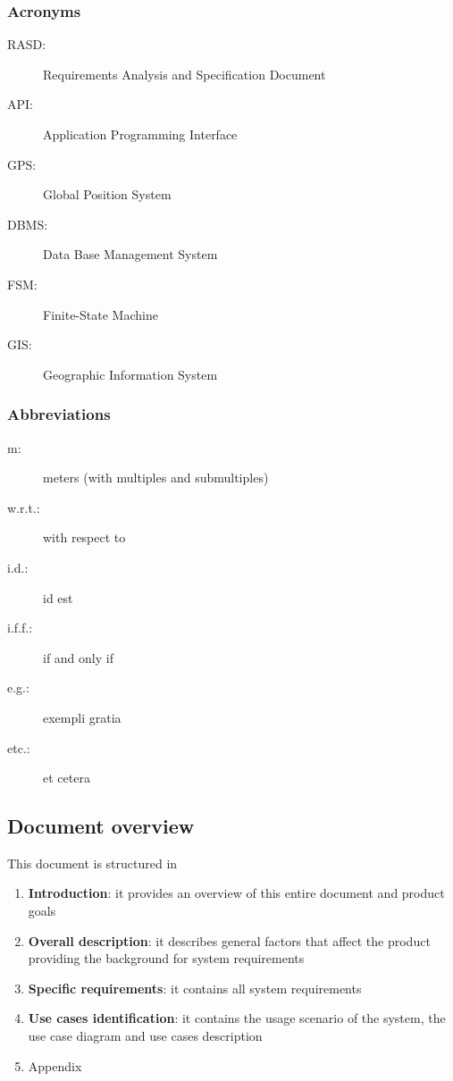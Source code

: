 \subsubsection{Acronyms}
	\begin{description}
		\item [RASD:] Requirements Analysis and Specification Document
		\item [API:] Application Programming Interface
		\item [GPS:] Global Position System
		\item [DBMS:] Data Base Management System
		\item [FSM:] Finite-State Machine
		\item [GIS:] Geographic Information System
	\end{description}
\subsubsection{Abbreviations}
	\begin{description}
		\item [m:] meters (with multiples and submultiples)
		\item [w.r.t.:] with respect to
		\item [i.d.:] id est
		\item [i.f.f.:] if and only if
		\item [e.g.:] exempli gratia
		\item [etc.:] et cetera
	\end{description}

\subsection{Document overview}
This document is structured in 
\begin{enumerate}
	\item \textbf{Introduction}: it provides an overview of this entire document and product goals
	\item \textbf{Overall description}: it describes general factors that affect the product providing the background for system requirements
	\item \textbf{Specific requirements}: it contains all system requirements
	\item \textbf{Use cases identification}: it contains the usage scenario of the system, the use case diagram and use cases description
	\item Appendix
\end{enumerate}